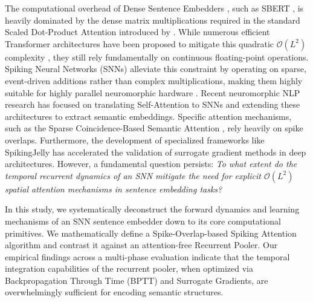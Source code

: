 \documentclass{article} %
\begin{document}
The computational overhead of Dense Sentence Embedders \citep{devlin2018bert}, such as SBERT \citep{reimers2019sentence}, is heavily dominated by the dense matrix multiplications required in the standard Scaled Dot-Product Attention introduced by \citet{vaswani2017attention}. While numerous efficient Transformer architectures have been proposed to mitigate this quadratic $\mathcal{O}(L^2)$ complexity \citep{tay2022efficient}, they still rely fundamentally on continuous floating-point operations. Spiking Neural Networks (SNNs) alleviate this constraint by operating on sparse, event-driven additions rather than complex multiplications, making them highly suitable for highly parallel neuromorphic hardware \citep{roy2019towards}. Recent neuromorphic NLP research has focused on translating Self-Attention to SNNs \citep{li2022spikeformer, zhu2023spikegpt} and extending these architectures to extract semantic embeddings. Specific attention mechanisms, such as the Sparse Coincidence-Based Semantic Attention \citep{coincidence2026}, rely heavily on spike overlaps. Furthermore, the development of specialized frameworks like SpikingJelly \citep{fang2023spikingjelly} has accelerated the validation of surrogate gradient methods in deep architectures. However, a fundamental question persists: \textit{To what extent do the temporal recurrent dynamics of an SNN mitigate the need for explicit $\mathcal{O}(L^2)$ spatial attention mechanisms in sentence embedding tasks?}

In this study, we systematically deconstruct the forward dynamics and learning mechanisms of an SNN sentence embedder down to its core computational primitives. We mathematically define a Spike-Overlap-based Spiking Attention algorithm and contrast it against an attention-free Recurrent Pooler. Our empirical findings across a multi-phase evaluation indicate that the temporal integration capabilities of the recurrent pooler, when optimized via Backpropagation Through Time (BPTT) and Surrogate Gradients, are overwhelmingly sufficient for encoding semantic structures.
\end{document}
